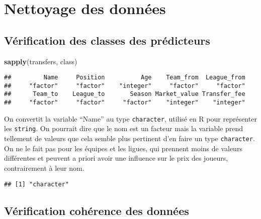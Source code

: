 \documentclass[]{article}
\newenvironment{Shaded}{\begin{snugshade}}{\end{snugshade}}
\newcommand{\KeywordTok}[1]{\textcolor[rgb]{0.13,0.29,0.53}{\textbf{#1}}}
\newcommand{\NormalTok}[1]{#1}
\newcommand{\OperatorTok}[1]{\textcolor[rgb]{0.81,0.36,0.00}{\textbf{#1}}}
\newcommand{\StringTok}[1]{\textcolor[rgb]{0.31,0.60,0.02}{#1}}
\begin{document}
\hypertarget{nettoyage-des-donnees}{%
\section{Nettoyage des données}\label{nettoyage-des-donnees}}

\hypertarget{verification-des-classes-des-predicteurs}{%
\subsection{Vérification des classes des
prédicteurs}\label{verification-des-classes-des-predicteurs}}

\begin{Shaded}
\begin{Highlighting}[]
\KeywordTok{sapply}\NormalTok{(transfers, class)}
\end{Highlighting}
\end{Shaded}

\begin{verbatim}
##         Name     Position          Age    Team_from  League_from 
##     "factor"     "factor"    "integer"     "factor"     "factor" 
##      Team_to    League_to       Season Market_value Transfer_fee 
##     "factor"     "factor"     "factor"    "integer"    "integer"
\end{verbatim}

On convertit la variable ``Name'' au type \texttt{character}, utilisé en
R pour représenter les \texttt{string}. On pourrait dire que le nom est
un facteur mais la variable prend tellement de valeurs que cela semble
plus pertinent d'en faire un type \texttt{character}. On ne le fait pas
pour les équipes et les ligues, qui prennent moins de valeurs
différentes et peuvent a priori avoir une influence sur le prix des
joueurs, contrairement à leur nom.

\begin{Shaded}
\end{Shaded}

\begin{verbatim}
## [1] "character"
\end{verbatim}

\hypertarget{verification-coherence-des-donnees}{%
\subsection{Vérification cohérence des
données}\label{verification-coherence-des-donnees}}
\end{document}
